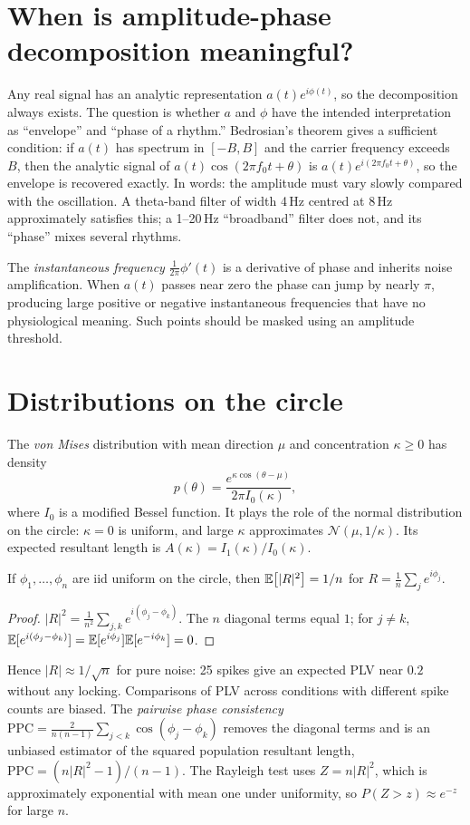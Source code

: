 \section{When is amplitude-phase decomposition meaningful?}
Any real signal has an analytic representation $a(t)e^{i\phi(t)}$, so the decomposition always exists. The question is whether $a$ and $\phi$ have the intended interpretation as ``envelope'' and ``phase of a rhythm.'' Bedrosian's theorem gives a sufficient condition: if $a(t)$ has spectrum in $[-B,B]$ and the carrier frequency exceeds $B$, then the analytic signal of $a(t)\cos(2\pi f_0t+\theta)$ is $a(t)e^{i(2\pi f_0t+\theta)}$, so the envelope is recovered exactly. In words: the amplitude must vary slowly compared with the oscillation. A theta-band filter of width 4\,Hz centred at 8\,Hz approximately satisfies this; a 1--20\,Hz ``broadband'' filter does not, and its ``phase'' mixes several rhythms.

The \emph{instantaneous frequency} $\frac1{2\pi}\phi'(t)$ is a derivative of phase and inherits noise amplification. When $a(t)$ passes near zero the phase can jump by nearly $\pi$, producing large positive or negative instantaneous frequencies that have no physiological meaning. Such points should be masked using an amplitude threshold.

\section{Distributions on the circle}
The \emph{von Mises} distribution with mean direction $\mu$ and concentration $\kappa\ge0$ has density
\[
p(\theta)=\frac{e^{\kappa\cos(\theta-\mu)}}{2\pi I_0(\kappa)},
\]
where $I_0$ is a modified Bessel function. It plays the role of the normal distribution on the circle: $\kappa=0$ is uniform, and large $\kappa$ approximates $\mathcal N(\mu,1/\kappa)$. Its expected resultant length is $A(\kappa)=I_1(\kappa)/I_0(\kappa)$.

\begin{proposition}
If $\phi_1,\ldots,\phi_n$ are iid uniform on the circle, then $\mathbb E\bigl[|R|^2\bigr]=1/n$ for $R=\frac1n\sum_je^{i\phi_j}$.
\end{proposition}
\begin{proof}
$|R|^2=\frac1{n^2}\sum_{j,k}e^{i(\phi_j-\phi_k)}$. The $n$ diagonal terms equal $1$; for $j\ne k$, $\mathbb E[e^{i(\phi_j-\phi_k)}]=\mathbb E[e^{i\phi_j}]\mathbb E[e^{-i\phi_k}]=0$.
\end{proof}
Hence $|R|\approx1/\sqrt n$ for pure noise: 25 spikes give an expected PLV near $0.2$ without any locking. Comparisons of PLV across conditions with different spike counts are biased. The \emph{pairwise phase consistency} $\mathrm{PPC}=\frac{2}{n(n-1)}\sum_{j<k}\cos(\phi_j-\phi_k)$ removes the diagonal terms and is an unbiased estimator of the squared population resultant length, $\mathrm{PPC}=(n|R|^2-1)/(n-1)$. The Rayleigh test uses $Z=n|R|^2$, which is approximately exponential with mean one under uniformity, so $P(Z>z)\approx e^{-z}$ for large $n$.

